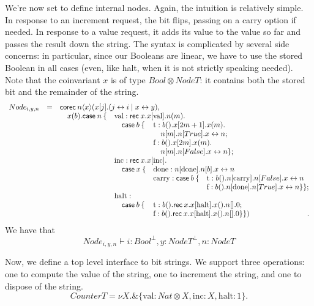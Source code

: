 \documentclass[orivec,envcountsame]{llncs}
\newcommand{\with}{\mathbin\binampersand}
\newcommand{\cpdual}[1]{#1^\perp}
\newcommand{\cptyp}[2]{#1 \vdash #2}
\newcommand{\mkwd}[1]{\mathsf{#1}}
\newcommand{\link}[2]{#1 \leftrightarrow #2}
\newcommand{\rec}[1]{\mkwd{rec}\:#1}
\newcommand{\clabel}[1]{\mathrm{#1}}
\newcommand{\sel}[2]{#1[\clabel{#2}]}
\begin{document}
We're now set to define internal nodes.  Again, the intuition is relatively simple.  In response to
an increment request, the bit flips, passing on a carry option if needed.  In response to a value
request, it adds its value to the value so far and passes the result down the string.  The syntax is
complicated by several side concerns: in particular, since our Booleans are linear, we have to use
the stored Boolean in all cases (even, like halt, when it is not strictly speaking needed).  Note
that the coinvariant $x$ is of type $Bool \otimes NodeT$: it contains both the stored bit and the
remainder of the string.
%
{\small\[\begin{array}{rcllll}
  Node_{i,y,n} & = & \multicolumn{4}{l}{\mkwd{corec}\:n \langle x \rangle (x[j].(\link{j}{i} \mid \link{x}{y}),} \\
  & & \quad x(b).\mkwd{case}\:n\: \{ &\multicolumn{3}{l}{\clabel{val}: \rec{x}.\sel{x}{val}.n(m).} \\
  & & & \quad \mkwd{case}\:b\: \{ &\multicolumn{2}{l}{\clabel{t}: b().x[2m + 1].x(m).} \\
  & & & & \multicolumn{2}{l}{\quad n[m].n[True].\link{x}{n};} \\
  & & & & \multicolumn{2}{l}{\clabel{f}: b().x[2m].x(m).} \\
  & & & & \multicolumn{2}{l}{\quad n[m].n[False].\link{x}{n} \};} \\
  & & & \multicolumn{3}{l}{\clabel{inc}: \rec{x}.\sel{x}{inc}.} \\
  & & & \quad \mkwd{case}\:x\:\{ &\multicolumn{2}{l}{\clabel{done}: \sel{n}{done}.n[b].\link{x}{n}} \\
  & & & &\clabel{carry}: \mkwd{case}\:b\: \{ &\clabel{t}: b().\sel{n}{carry}.n[False].\link{x}{n} \\
  & & & & &\clabel{f}: b().\sel{n}{done}.n[True].\link{x}{n} \} \}; \\
  & & &\clabel{halt}: \\
  & & &\quad \mkwd{case}\:b\:\{ &\multicolumn{2}{l}{\clabel{t}: b().\rec{x}.\sel{x}{halt}.x().n[].0;} \\
  & & & &\multicolumn{2}{l}{\clabel{f}: b().\rec{x}.\sel{x}{halt}.x().n[].0 \} \})}.
\end{array}\]}
We have that
{\small\[
  \cptyp{Node_{i,y,n}}{i:\cpdual{Bool},y:\cpdual{NodeT},n:NodeT}
\]}

Now, we define a top level interface to bit strings.  We support three operations: one to compute
the value of the string, one to increment the string, and one to dispose of the string.
%
{\small\[
 CounterT = \nu X. \with \{ \clabel{val}: Nat \otimes X, \clabel{inc}:X, \clabel{halt}:1 \}.
\]}
\end{document}
